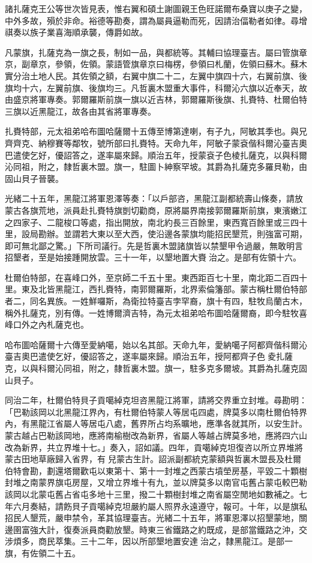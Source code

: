 \begin{pinyinscope}
諸扎薩克王公等世次皆見表，惟右翼和碩土謝圖親王色旺諾爾布桑寶以庚子之變，中外多故，殞於非命。裕德等勘奏，謂為屬員逼勒而死，因請治偪勒者如律。尋增祺奏以族子業喜海順承襲，傳爵如故。

凡蒙旗，扎薩克為一旗之長，制如一品，與都統等。其輔曰協理臺吉。屬曰管旗章京，副章京，參領，佐領。蒙語管旗章京曰梅楞，參領曰札蘭，佐領曰蘇木。蘇木實分治土地人民。其佐領之額，右翼中旗二十二，左翼中旗四十六，右翼前旗、後旗均十六，左翼前旗、後旗均三。凡哲裏木盟重大事件，科爾沁六旗以近奉天，故由盛京將軍專奏。郭爾羅斯前旗一旗以近吉林，郭爾羅斯後旗、扎賚特、杜爾伯特三旗以近黑龍江，故各由其省將軍專奏。

扎賚特部，元太祖弟哈布圖哈薩爾十五傳至博第達喇，有子九，阿敏其季也。與兄齊齊克、納穆賽等鄰牧，號所部曰扎賚特。天命九年，阿敏子蒙袞偕科爾沁臺吉奧巴遣使乞好，優詔答之，遂率屬來歸。順治五年，授蒙袞子色棱扎薩克，以與科爾沁同祖，附之，隸哲裏木盟。旗一，駐圖卜紳察罕坡。其爵為扎薩克多羅貝勒，由固山貝子晉襲。

光緒二十五年，黑龍江將軍恩澤等奏：「以戶部咨，黑龍江副都統壽山條奏，請放蒙古各旗荒地，派員赴扎賚特旗剴切勸商，原將屬界南接郭爾羅斯前旗，東濱嫩江之四家子、二龍梭口等處，指出開放，南北約長三百餘里，東西寬百餘里或三四十里，設局勘辦。並謂若大東以至大西，使沿邊各蒙旗均能招民墾荒，則強富可期，即可無北鄙之驚。」下所司議行。先是哲裏木盟諸旗皆以禁墾甲令過嚴，無敢明言招墾者，至是始接踵開放雲。三十一年，以墾地置大賚治之。是部有佐領十六。

杜爾伯特部，在喜峰口外，至京師二千五十里。東西距百七十里，南北距二百四十里。東及北皆黑龍江，西扎賚特，南郭爾羅斯，北界索倫籓部。蒙古稱杜爾伯特部者二，同名異族。一姓鮮囉斯，為衛拉特臺吉孛罕裔，旗十有四，駐牧烏蘭古木，稱外扎薩克，別有傳。一姓博爾濟吉特，為元太祖弟哈布圖哈薩爾裔，即今駐牧喜峰口外之內札薩克也。

哈布圖哈薩爾十六傳至愛納噶，始以名其部。天命九年，愛納噶子阿都齊偕科爾沁臺吉奧巴遣使乞好，優詔答之，遂率屬來歸。順治五年，授阿都齊子色夌扎薩克，以與科爾沁同祖，附之，隸哲裏木盟。旗一，駐多克多爾坡。其爵為扎薩克固山貝子。

同治二年，杜爾伯特貝子貢噶綽克坦咨黑龍江將軍，請將交界重立封堆。尋勘明：「巴勒該岡以北黑龍江界內，有杜爾伯特蒙人等居屯四處，牌莫多以南杜爾伯特界內，有黑龍江省屬人等居屯八處，舊界所占均系曠地，應準各就其所，以安生計。蒙古越占巴勒該岡地，應將南榆樹改為新界，省屬人等越占牌莫多地，應將四六山改為新界，共立界堆十七。」奏入，詔如議。四年，貢噶綽克坦復咨以所立界堆將蒙古田地草廠歸入省界，有兒蒙古生計。詔派副都統克蒙額與哲裏木盟長及杜爾伯特會勘，劃還塔爾歡屯以東第十、第十一封堆之西蒙古墳塋房基，平毀二十顆樹封堆之南蒙界旗屯房屋，又增立界堆十有九，並以牌莫多以南官屯舊占蒙屯較巴勒該岡以北蒙屯舊占省屯多地十三里，撥二十顆樹封堆之南省屬空閒地如數補之。七年六月奏結，請飭貝子貢噶綽克坦嚴約屬人照界永遠遵守，報可。十年，以是旗私招民人墾荒，嚴申禁令，革其協理臺吉。光緒二十五年，將軍恩澤以招墾蒙地，關邊圉富強大計，復奏派員商勸放墾。時東三省鐵路之約既成，是部當鐵路之沖，交涉煩多，商民萃集。三十二年，因以所部墾地置安達治之，隸黑龍江。是部一旗，有佐領二十五。


\end{pinyinscope}
